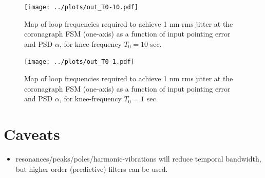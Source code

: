 \documentclass[10pt,preprint]{aastex631}
\begin{document}
\begin{figure}
\centering
\texttt{[image: ../plots/out\_T0-10.pdf]}
\caption{Map of loop frequencies required to achieve 1 nm rms jitter at the coronagraph FSM (one-axis) as a function of input pointing error and PSD $\alpha$, for knee-frequency $T_0 = 10$ sec.  \label{fig:T0-10}}
\end{figure}

\begin{figure}
\centering
\texttt{[image: ../plots/out\_T0-1.pdf]}
\caption{Map of loop frequencies required to achieve 1 nm rms jitter at the coronagraph FSM (one-axis) as a function of input pointing error and PSD $\alpha$, for knee-frequency $T_0 = 1$ sec.  \label{fig:T0-1}}
\end{figure}


\section{Caveats}

\begin{itemize}
\item resonances/peaks/poles/harmonic-vibrations will reduce temporal bandwidth, but higher order (predictive) filters can be used.  \\
\end{itemize}




\end{document}

